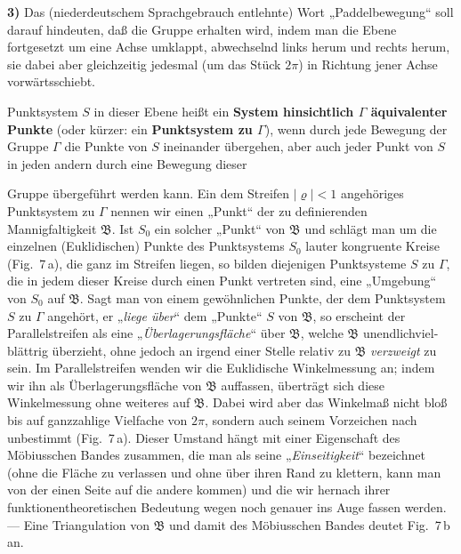 \documentclass{article}
\begin{document}
\textbf{3)} Das (niederdeutschem Sprachgebrauch entlehnte) Wort „Paddelbewegung“ soll darauf hindeuten, daß die Gruppe erhalten wird, indem man die Ebene fortgesetzt um eine Achse umklappt, abwechselnd links herum und rechts herum, sie dabei aber gleichzeitig jedesmal (um das Stück $2\pi$) in Richtung jener Achse vorwärtsschiebt.

Punktsystem $S$ in dieser Ebene heißt ein \textbf{System hinsichtlich $\varGamma$ äquivalenter Punkte} (oder kürzer: ein \textbf{Punktsystem zu $\varGamma$}), wenn durch jede Bewegung der Gruppe $\varGamma$ die Punkte von $S$ ineinander übergehen, aber auch jeder Punkt von $S$ in jeden andern durch eine Bewegung dieser


Gruppe übergeführt werden kann. Ein dem Streifen $|\varrho| < 1$ angehöriges Punktsystem zu $\varGamma$ nennen wir einen „Punkt“ der zu definierenden Mannigfaltigkeit $\mathfrak{B}$. Ist $S_0$ ein solcher „Punkt“ von $\mathfrak{B}$ und schlägt man um die einzelnen (Euklidischen) Punkte des Punktsystems $S_0$ lauter kongruente Kreise (Fig.~7\,a), die ganz im Streifen liegen, so bilden diejenigen Punktsysteme $S$ zu $\varGamma$, die in jedem dieser Kreise durch einen Punkt vertreten sind, eine „Umgebung“ von $S_0$ auf $\mathfrak{B}$. Sagt man von einem gewöhnlichen Punkte, der dem Punktsystem $S$ zu $\varGamma$ angehört, er „\emph{liege über}“ dem „Punkte“ $S$ von $\mathfrak{B}$, so erscheint der Parallelstreifen als eine „\emph{Überlagerungsfläche}“ über $\mathfrak{B}$, welche $\mathfrak{B}$ unendlichviel-blättrig überzieht, ohne jedoch an irgend einer Stelle relativ zu $\mathfrak{B}$ \emph{verzweigt} zu sein. Im Parallelstreifen wenden wir die Euklidische Winkelmessung an; indem wir ihn als Überlagerungsfläche von $\mathfrak{B}$ auffassen, überträgt sich diese Winkelmessung ohne weiteres auf $\mathfrak{B}$. Dabei wird aber das Winkelmaß nicht bloß bis auf ganzzahlige Vielfache von $2\pi$, sondern auch seinem Vorzeichen nach unbestimmt (Fig.~7\,a). Dieser Umstand hängt mit einer Eigenschaft des Möbiusschen Bandes zusammen, die man als seine „\emph{Einseitigkeit}“ bezeichnet (ohne die Fläche zu verlassen und ohne über ihren Rand zu klettern, kann man von der einen Seite auf die andere kommen) und die wir hernach ihrer funktionentheoretischen Bedeutung wegen noch genauer ins Auge fassen werden. --- Eine Triangulation von $\mathfrak{B}$ und damit des Möbiusschen Bandes deutet Fig.~7\,b an.
\end{document}
